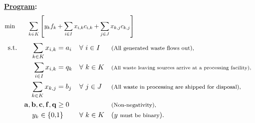 \documentclass[12pt]{amsart}
\begin{document}
\textbf{\underline{Program}:} \\

\[ \min \qquad \sum_{k\in K} \left[ y_kf_k + \sum_{i\in I} x_{i,k}c_{i,k} + \sum_{j\in J} x_{k,j}c_{k,j} \right]
 	\hspace{45ex} \]
\begin{align*} 
	\text{s.t.}\qquad
	\sum_{k\in K} x_{i,k} &= a_i & & \forall\ i\in I & & \text{\footnotesize(All generated waste flows out),}  \\
	\sum_{i\in I} x_{i,k} &= q_k & & \forall\ k\in K & & \text{\scriptsize(All waste leaving sources arrive at a processing facility),}  \\
	\sum_{k\in K} x_{k,j} &= b_j & & \forall\ j\in J & & \text{\footnotesize(All waste in processing are shipped for disposal),}  \\
	\mathbf{a,b,c,f,q} &\geq 0 & & & & \text{\footnotesize(Non-negativity),} \\
	y_k \in \{0,&1\} & &\forall\ k\in K & & (y\text{ \footnotesize must be binary}).
\end{align*}
\end{document}
